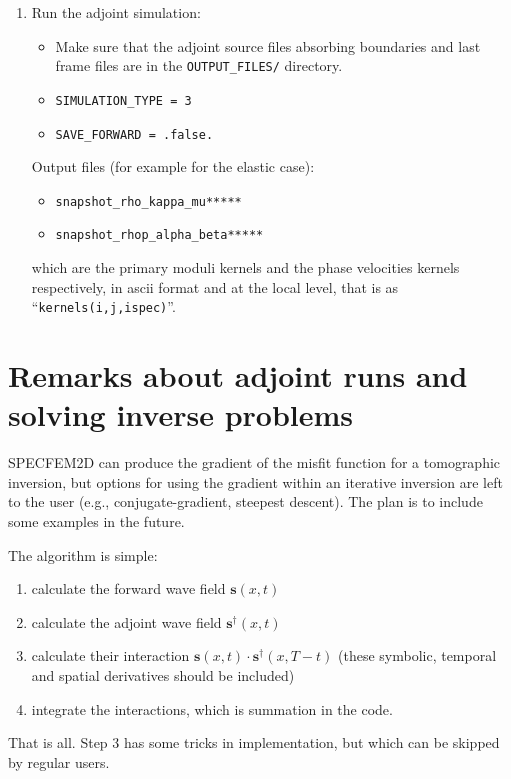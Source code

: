 \documentclass[oneside,english,onecolumn,letterpaper]{book}
\begin{document}
\begin{enumerate}
\item Run the adjoint simulation:
\begin{itemize}
\item Make sure that the adjoint source files absorbing boundaries and last frame files are
in the \texttt{OUTPUT\_FILES/} directory.
\item \texttt{SIMULATION\_TYPE = 3}
\item \texttt{SAVE\_FORWARD = .false.}
\end{itemize}

Output files (for example for the elastic case):
\begin{itemize}
\item \texttt{snapshot\_rho\_kappa\_mu*****}
\item \texttt{snapshot\_rhop\_alpha\_beta*****}
\end{itemize}
which are the primary moduli kernels and the phase velocities kernels respectively, in ascii format
and at the local level, that is as ``\texttt{kernels(i,j,ispec)}''.

\end{enumerate}

\section{Remarks about adjoint runs and solving inverse problems}

SPECFEM2D can produce the gradient of the misfit function for a
tomographic inversion, but options for using the gradient within an
iterative inversion are left to the user (e.g., conjugate-gradient,
steepest descent). The plan is to include some examples in the future.

The algorithm is simple:
%
\begin{enumerate}
\item calculate the forward wave field $\mathbf{s}(x,t)$
\item calculate the adjoint wave field $\mathbf{s}^\dagger(x,t)$
\item calculate their interaction $\mathbf{s}(x,t) \cdot \mathbf{s}^\dagger(x,T-t)$ (these symbolic, temporal and spatial derivatives should be included)
\item integrate the interactions, which is summation in the code.
\end{enumerate}
%
That is all. Step 3 has some tricks in implementation, but which can be skipped by regular users.
\end{document}
